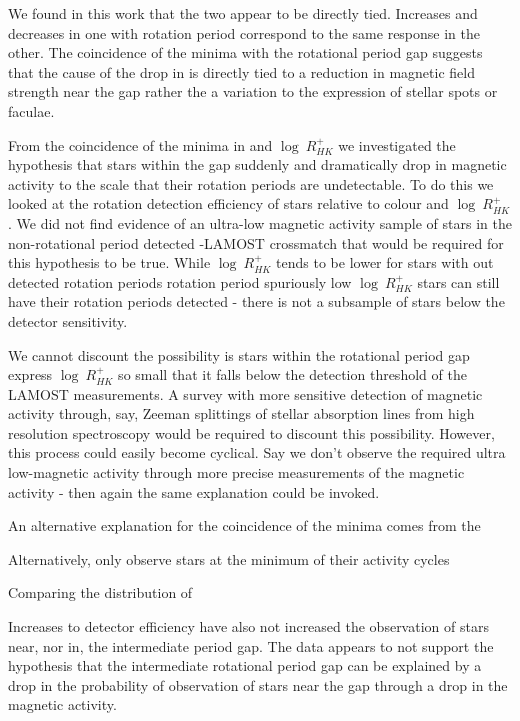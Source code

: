  
We found in this work that the two appear to be directly tied.
Increases and decreases in one with rotation period correspond to the same response in the other.
The coincidence of the minima with the rotational period gap suggests that the cause of the drop in \rper{} is directly tied to a reduction in magnetic field strength near the gap rather the a variation to the expression of stellar spots or faculae.

From the coincidence of the minima in \rper{} and $\log \ R^{+}_{HK}$ we investigated the hypothesis that stars within the gap suddenly and dramatically drop in magnetic activity to the scale that their rotation periods are undetectable.
To do this we looked at the rotation detection efficiency of stars relative to colour and $\log \ R^{+}_{HK}$.
We did not find evidence of an ultra-low magnetic activity sample of stars in the non-rotational period detected \kepler{}-LAMOST crossmatch that would be required for this hypothesis to be true.
While $\log \ R^{+}_{HK}$  tends to be lower for stars with out detected rotation periods rotation period spuriously low $\log \ R^{+}_{HK}$ stars can still have their rotation periods detected - there is not a subsample of stars below the detector sensitivity.

We cannot discount the possibility is stars within the rotational period gap express $\log \ R^{+}_{HK}$ so small that it falls below the detection threshold of the LAMOST measurements.
A survey with more sensitive detection of magnetic activity through, say, Zeeman splittings of stellar absorption lines from high resolution spectroscopy would be required to discount this possibility.
However, this process could easily become cyclical.
Say we don't observe the required ultra low-magnetic activity through more precise measurements of the magnetic activity - then again the same explanation could be invoked.



An alternative explanation for the coincidence of the minima comes from the

Alternatively, only observe stars at the minimum of their activity cycles





Comparing the distribution of


Increases to detector efficiency have also not increased the observation of stars near, nor in, the intermediate period gap.
The data appears to not support the hypothesis that the intermediate rotational period gap can be explained by a drop in the probability of observation of stars near the gap through a drop in the magnetic activity.




